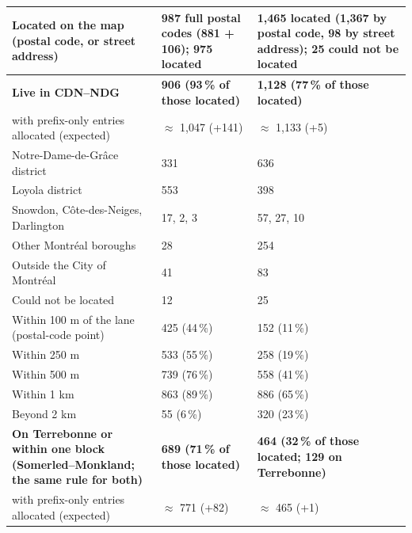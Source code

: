\documentclass[10pt,letterpaper]{article}
\begin{document}
\begin{tabular}{@{}p{2.05in}p{2.35in}p{2.35in}@{}}
Located on the map (postal code, or street address) & 987 full postal codes (881 + 106); 975 located & 1,465 located (1,367 by postal code, 98 by street address); 25 could not be located \\
\midrule
\textbf{Live in CDN--NDG} & \textbf{906 (93\,\% of those located)} & \textbf{1,128 (77\,\% of those located)} \\
\quad with prefix-only entries allocated (expected) & $\approx$ 1,047 (+141) & $\approx$ 1,133 (+5) \\
\quad Notre-Dame-de-Grâce district & 331 & 636 \\
\quad Loyola district & 553 & 398 \\
\quad Snowdon, Côte-des-Neiges, Darlington & 17, 2, 3 & 57, 27, 10 \\
Other Montréal boroughs & 28 & 254 \\
Outside the City of Montréal & 41 & 83 \\
Could not be located & 12 & 25 \\
\midrule
Within 100 m of the lane (postal-code point) & 425 (44\,\%) & 152 (11\,\%) \\
Within 250 m & 533 (55\,\%) & 258 (19\,\%) \\
Within 500 m & 739 (76\,\%) & 558 (41\,\%) \\
Within 1 km & 863 (89\,\%) & 886 (65\,\%) \\
Beyond 2 km & 55 (6\,\%) & 320 (23\,\%) \\
\textbf{On Terrebonne or within one block (Somerled--Monkland; the same rule for both)} & \textbf{689 (71\,\% of those located)} & \textbf{464 (32\,\% of those located; 129 on Terrebonne)} \\
\quad with prefix-only entries allocated (expected) & $\approx$ 771 (+82) & $\approx$ 465 (+1) \\
\bottomrule\end{tabular}\\[8pt]
\end{document}
